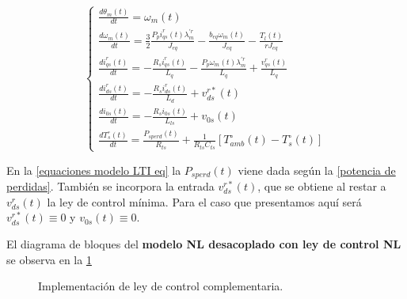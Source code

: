 \documentclass[a4paper, 10pt, onecolumn,journal]{ieeeconf}
\begin{document}
\begin{equation}
	\begin{cases}
		\frac{d \theta_m(t)}{dt} = {\omega}_m(t)\\
		\frac{d \omega_m(t)}{dt} = \frac{3}{2} \frac{P_p i^r_{qs}(t)\lambda^{'r}_m}{J_{eq}} - \frac{b_{eq}\omega_m(t)}{J_{eq}} - \frac{T_l(t)}{r J_{eq}}\\
		\frac{d i^r_{qs}(t)}{dt} = -\frac{R_s i^r_{qs}(t)}{L_q} - \frac{P_p \omega_m(t) \lambda^{'r}_m}{L_q}+ \frac{v^r_{qs}(t)}{L_q}\\
		\frac{d i^r_{ds}(t)}{dt} = -\frac{R_s i^r_{ds}(t)}{L_d}	+ v^{r*}_{ds}(t)\\
		\frac{d i_{0s}(t)}{dt} = -\frac{R_s i_{0s}(t)}{L_{ls}}	+ v_{0s}(t)\\
		\frac{d T^\circ_{s}(t)}{dt} = \frac{P_{sperd}(t)}{R_{ts}} + \frac{1}{R_{ts}C_{ts}}\left[T^{\circ}_{amb}(t) - T_{s}^{\circ}(t)\right]
	\end{cases}
	\label{equaciones modelo LTI eq}
\end{equation}

En la \cref{equaciones modelo LTI eq} la $P_{sperd}(t)$ viene dada según la \cref{potencia de perdidas}. También se incorpora la entrada $v^{r*}_{ds}(t)$, que se obtiene al restar a  $v^r_{ds}(t)$
la ley de control mínima. Para el caso que presentamos aquí será $v^{r*}_{ds}(t) \equiv 0$ y $v_{0s}(t) \equiv0 $.


El diagrama de bloques del \textbf{modelo NL desacoplado con ley de control NL} se observa en la \cref{Implementación de ley de control complementaria}

\begin{figure}[H]
	\centering
	\begin{adjustbox}{scale=0.7,max width=\columnwidth}
	\end{adjustbox}
	\caption{Implementación de ley de control complementaria.}
	\label{Implementación de ley de control complementaria}
\end{figure}
\end{document}

